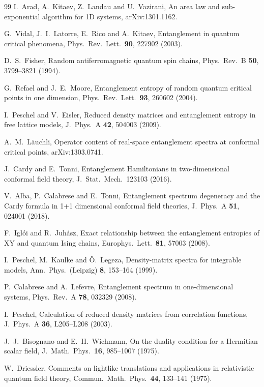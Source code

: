\documentclass[10pt,a4paper]{article}
\theoremstyle{remark}
\begin{document}
\begin{thebibliography}{99}
 I.~Arad, A.~Kitaev, Z.~Landau and U.~Vazirani, An area law and sub-exponential
algorithm for 1D systems, arXiv:1301.1162.

 G.~Vidal, J.~I.~Latorre, E.~Rico and A.~Kitaev, Entanglement in quantum
critical phenomena, Phys.\ Rev.\ Lett.\ \textbf{90}, 227902 (2003).

 D.~S.~Fisher, Random antiferromagnetic quantum spin chains, Phys.\ Rev.\ B
\textbf{50}, 3799--3821 (1994).

 G.~Refael and J.~E.~Moore, Entanglement entropy of random quantum
critical points in one dimension, Phys.\ Rev.\ Lett.\ \textbf{93}, 260602 (2004).

 I.~Peschel and V.~Eisler, Reduced density matrices and entanglement
entropy in free lattice models, J.\ Phys.\ A \textbf{42}, 504003 (2009).

 A.~M.~L\"auchli, Operator content of real-space entanglement spectra at
conformal critical points, arXiv:1303.0741.

 J.~Cardy and E.~Tonni, Entanglement Hamiltonians in two-dimensional
conformal field theory, J.\ Stat.\ Mech.\ 123103 (2016).

 V.~Alba, P.~Calabrese and E.~Tonni, Entanglement spectrum degeneracy and the
Cardy formula in 1+1 dimensional conformal field theories, J.\ Phys.\ A \textbf{51}, 024001
(2018).

 F.~Igl\'oi and R.~Juh\'asz, Exact relationship between the entanglement
entropies of XY and quantum Ising chains, Europhys.\ Lett.\ \textbf{81}, 57003 (2008).

 I.~Peschel, M.~Kaulke and \"O.~Legeza, Density-matrix spectra for integrable
models, Ann.\ Phys.\ (Leipzig) \textbf{8}, 153--164 (1999).

 P.~Calabrese and A.~Lefevre, Entanglement spectrum in
one-dimensional systems, Phys.\ Rev.\ A \textbf{78}, 032329 (2008).

 I.~Peschel, Calculation of reduced density matrices from correlation
functions, J.\ Phys.\ A \textbf{36}, L205--L208 (2003).

 J.~J.~Bisognano and E.~H.~Wichmann, On the duality condition for a
Hermitian scalar field, J.\ Math.\ Phys.\ \textbf{16}, 985--1007 (1975).

 W.~Driessler, Comments on lightlike translations and applications in
relativistic quantum field theory, Commun.\ Math.\ Phys.\ \textbf{44}, 133--141 (1975).


\end{thebibliography}
\end{document}
